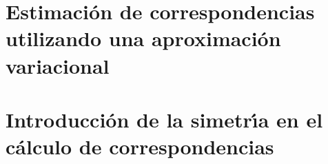 \documentclass[12pt,spanish]{book}
\newlength{\defbaselineskip}
\newcommand{\setlinespacing}[1]
           {\setlength{\baselineskip}{#1 \defbaselineskip}}
\theoremstyle{plain}
\numberwithin{equation}{section}
\renewcommand{\theequation}{\thesection.\arabic{equation}}
\begin{document}
\part{Estimaci\'{o}n de correspondencias utilizando una aproximaci\'{o}n variacional}




\part{Introducci\'{o}n de la simetr\'{\i}a en el c\'{a}lculo de correspondencias}








\appendix
\renewcommand{\theequation}{A-\arabic{equation}}
\setcounter{equation}{0}  %

\renewcommand{\theequation}{B-\arabic{equation}}
\setcounter{equation}{0}  %

\renewcommand{\theequation}{C-\arabic{equation}}
\setcounter{equation}{0}




%
%

%
%


\end{document}
